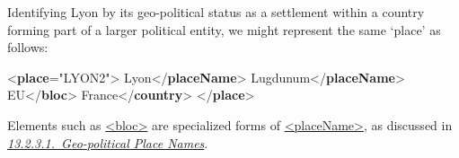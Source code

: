 Identifying Lyon by its geo-political status as a settlement within a country forming part of a larger political entity, we might represent the same ‘place’ as follows: \par\bgroup{}\exampleFont \begin{shaded}\noindent\mbox{}{<\textbf{place}\hspace*{1em}{xml:id}="{LYON2}">}\mbox{}\newline 
{}Lyon{</\textbf{placeName}>}\mbox{}\newline 
{}Lugdunum{</\textbf{placeName}>}\mbox{}\newline 
{}\mbox{}\newline 
\hspace*{1em}EU{</\textbf{bloc}>}\mbox{}\newline 
\hspace*{1em}France{</\textbf{country}>}\mbox{}\newline 
{}\mbox{}\newline 
{</\textbf{place}>}\end{shaded}\egroup\par \noindent  Elements such as \hyperref[TEI.bloc]{<bloc>} are specialized forms of \hyperref[TEI.placeName]{<placeName>}, as discussed in \textit{\hyperref[NDPLGU]{13.2.3.1.\ Geo-political Place Names}}.\par
